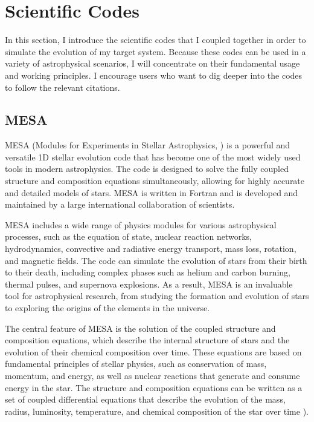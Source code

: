 \section{Scientific Codes}\label{sec:scientific_codes}

In this section, I introduce the scientific codes that I coupled together in order to simulate the evolution of my target system.  Because these codes can be used in a variety of astrophysical scenarios, I will concentrate on their fundamental usage and working principles. I encourage users who want to dig deeper into the codes to follow the relevant citations. 

\subsection{MESA}

MESA (Modules for Experiments in Stellar Astrophysics, \cite{paxton2010modules,paxton2013modules,paxton2015modules,paxton2019modules}) is a powerful and versatile 1D stellar evolution code that has become one of the most widely used tools in modern astrophysics. The code is designed to solve the fully coupled structure and composition equations simultaneously, allowing for highly accurate and detailed models of stars. MESA is written in Fortran and is developed and maintained by a large international collaboration of scientists.

MESA includes a wide range of physics modules for various astrophysical processes, such as the equation of state, nuclear reaction networks, hydrodynamics, convective and radiative energy transport, mass loss, rotation, and magnetic fields. The code can simulate the evolution of stars from their birth to their death, including complex phases such as helium and carbon burning, thermal pulses, and supernova explosions. As a result, MESA is an invaluable tool for astrophysical research, from studying the formation and evolution of stars to exploring the origins of the elements in the universe.

The central feature of MESA is the solution of the coupled structure and composition equations, which describe the internal structure of stars and the evolution of their chemical composition over time. These equations are based on fundamental principles of stellar physics, such as conservation of mass, momentum, and energy, as well as nuclear reactions that generate and consume energy in the star. The structure and composition equations can be written as a set of coupled differential equations that describe the evolution of the mass, radius, luminosity, temperature, and chemical composition of the star over time \citep{paxton2010modules,paxton2013modules,paxton2015modules,paxton2019modules}).

